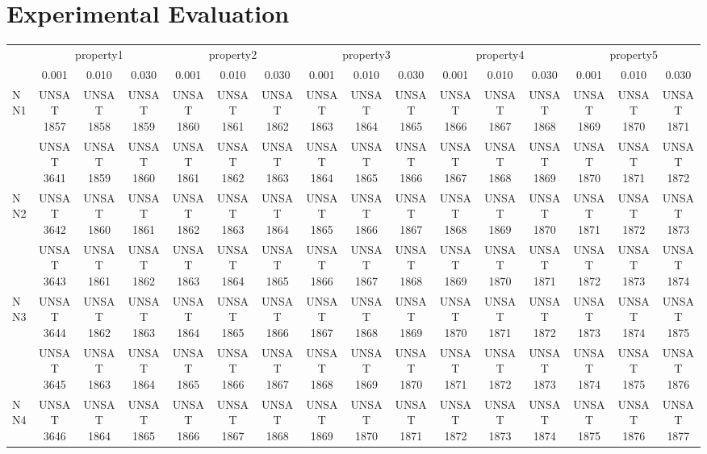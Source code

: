 \documentclass[runningheads]{llncs}
\begin{document}
\section{Experimental Evaluation}
\begin{table}[h]\tiny
\begin{tabular}{lccccccccccccccc} 
    & 	 \multicolumn{3}{c}{property1} 	 & 	 \multicolumn{3}{c}{property2} 	 & 	 \multicolumn{3}{c}{property3} 	 & 	 \multicolumn{3}{c}{property4} 	 & 	 \multicolumn{3}{c}{property5} \\ 
    & 	 0.001 	 & 	 0.010 	 & 	 0.030 	 & 	 0.001 	 & 	 0.010 	 & 	 0.030 	 & 	 0.001 	 & 	 0.010 	 & 	 0.030 	 & 	 0.001 	 & 	 0.010 	 & 	 0.030 	 & 	 0.001 	 & 	 0.010 	 & 	 0.030 \\ 
NN1 	 & 	 UNSAT 1857 	 & 	 UNSAT 1858 	 & 	 UNSAT 1859 	 & 	 UNSAT 1860 	 & 	 UNSAT 1861 	 & 	 UNSAT 1862 	 & 	 UNSAT 1863 	 & 	 UNSAT 1864 	 & 	 UNSAT 1865 	 & 	 UNSAT 1866 	 & 	 UNSAT 1867 	 & 	 UNSAT 1868 	 & 	 UNSAT 1869 	 & 	 UNSAT 1870 	 & 	 UNSAT 1871 \\ 
    & 	 UNSAT 3641 	 & 	 UNSAT 1859 	 & 	 UNSAT 1860 	 & 	 UNSAT 1861 	 & 	 UNSAT 1862 	 & 	 UNSAT 1863 	 & 	 UNSAT 1864 	 & 	 UNSAT 1865 	 & 	 UNSAT 1866 	 & 	 UNSAT 1867 	 & 	 UNSAT 1868 	 & 	 UNSAT 1869 	 & 	 UNSAT 1870 	 & 	 UNSAT 1871 	 & 	 UNSAT 1872 \\ 
NN2 	 & 	 UNSAT 3642 	 & 	 UNSAT 1860 	 & 	 UNSAT 1861 	 & 	 UNSAT 1862 	 & 	 UNSAT 1863 	 & 	 UNSAT 1864 	 & 	 UNSAT 1865 	 & 	 UNSAT 1866 	 & 	 UNSAT 1867 	 & 	 UNSAT 1868 	 & 	 UNSAT 1869 	 & 	 UNSAT 1870 	 & 	 UNSAT 1871 	 & 	 UNSAT 1872 	 & 	 UNSAT 1873 \\ 
    & 	 UNSAT 3643 	 & 	 UNSAT 1861 	 & 	 UNSAT 1862 	 & 	 UNSAT 1863 	 & 	 UNSAT 1864 	 & 	 UNSAT 1865 	 & 	 UNSAT 1866 	 & 	 UNSAT 1867 	 & 	 UNSAT 1868 	 & 	 UNSAT 1869 	 & 	 UNSAT 1870 	 & 	 UNSAT 1871 	 & 	 UNSAT 1872 	 & 	 UNSAT 1873 	 & 	 UNSAT 1874 \\ 
NN3 	 & 	 UNSAT 3644 	 & 	 UNSAT 1862 	 & 	 UNSAT 1863 	 & 	 UNSAT 1864 	 & 	 UNSAT 1865 	 & 	 UNSAT 1866 	 & 	 UNSAT 1867 	 & 	 UNSAT 1868 	 & 	 UNSAT 1869 	 & 	 UNSAT 1870 	 & 	 UNSAT 1871 	 & 	 UNSAT 1872 	 & 	 UNSAT 1873 	 & 	 UNSAT 1874 	 & 	 UNSAT 1875 \\ 
    & 	 UNSAT 3645 	 & 	 UNSAT 1863 	 & 	 UNSAT 1864 	 & 	 UNSAT 1865 	 & 	 UNSAT 1866 	 & 	 UNSAT 1867 	 & 	 UNSAT 1868 	 & 	 UNSAT 1869 	 & 	 UNSAT 1870 	 & 	 UNSAT 1871 	 & 	 UNSAT 1872 	 & 	 UNSAT 1873 	 & 	 UNSAT 1874 	 & 	 UNSAT 1875 	 & 	 UNSAT 1876 \\ 
NN4 	 & 	 UNSAT 3646 	 & 	 UNSAT 1864 	 & 	 UNSAT 1865 	 & 	 UNSAT 1866 	 & 	 UNSAT 1867 	 & 	 UNSAT 1868 	 & 	 UNSAT 1869 	 & 	 UNSAT 1870 	 & 	 UNSAT 1871 	 & 	 UNSAT 1872 	 & 	 UNSAT 1873 	 & 	 UNSAT 1874 	 & 	 UNSAT 1875 	 & 	 UNSAT 1876 	 & 	 UNSAT 1877 \\ 

\end{tabular}
\end{table}
\end{document}
